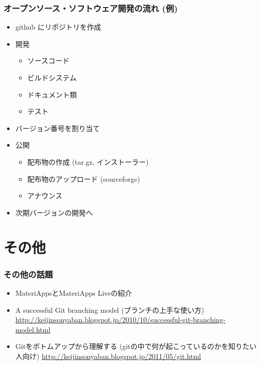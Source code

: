 \begin{frame}
  \frametitle{オープンソース・ソフトウェア開発の流れ (例)}
  \begin{itemize}
  \item github にリポジトリを作成
  \item 開発
    \begin{itemize}
    \item ソースコード
    \item ビルドシステム
    \item ドキュメント類
    \item テスト
    \end{itemize}
  \item バージョン番号を割り当て
  \item 公開
    \begin{itemize}
    \item 配布物の作成 (tar.gz, インストーラー)
    \item 配布物のアップロード (sourceforge)
    \item アナウンス
    \end{itemize}
  \item 次期バージョンの開発へ
  \end{itemize}
\end{frame}

\section{その他}

\begin{frame}
  \frametitle{その他の話題}
  \begin{itemize}
    \setlength{\itemsep}{1em}
  \item MateriAppsとMateriApps Liveの紹介
  \item A successful Git branching model (ブランチの上手な使い方) \url{http://keijinsonyaban.blogspot.jp/2010/10/successful-git-branching-model.html}
  \item Gitをボトムアップから理解する (gitの中で何が起こっているのかを知りたい人向け) 
    \url{http://keijinsonyaban.blogspot.jp/2011/05/git.html}
  \end{itemize}
\end{frame}


